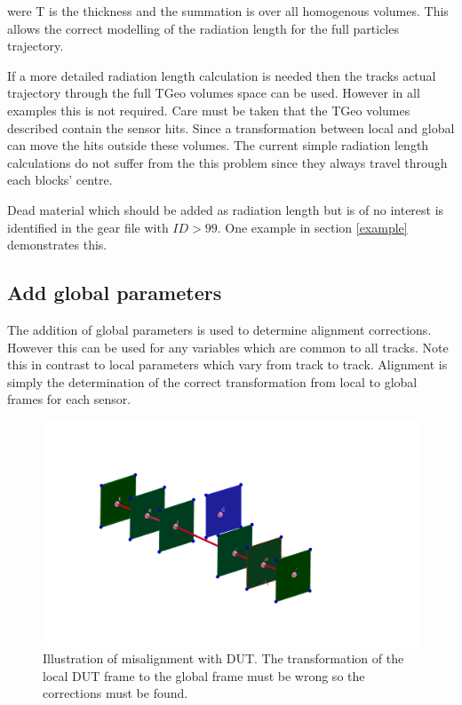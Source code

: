 were T is the thickness and the summation is over all homogenous volumes.  This allows the correct modelling of the radiation length for the full particles trajectory. 

If a more detailed radiation length calculation is needed then the tracks actual trajectory through the full TGeo volumes space can be used. However in all examples this is not required. Care must be taken that the TGeo volumes described contain the sensor hits. Since a transformation between local and global can move the hits outside these volumes. The current simple radiation length calculations do not suffer from the this problem since they always travel through each blocks' centre.

Dead material which should be added as radiation length but is of no interest is identified in the gear file with $ID>99$. One example in section \ref{example} demonstrates this.



\subsection{Add global parameters}
\label{gloPar}
The addition of global parameters is used to determine alignment corrections. However this can be used for any variables which are common to all tracks. Note this in contrast to local parameters which vary from track to track.  Alignment is simply the determination of the correct transformation from local to global frames for each sensor. 

\begin{figure}[H]
\centering
\includegraphics[width=1.0\linewidth]{figures/MisAlignStraight.png}
\caption{Illustration of misalignment with DUT. The transformation of the local DUT frame to the global frame must be wrong so the corrections must be found.}
\label{fig:MisAlign}
\end{figure}

